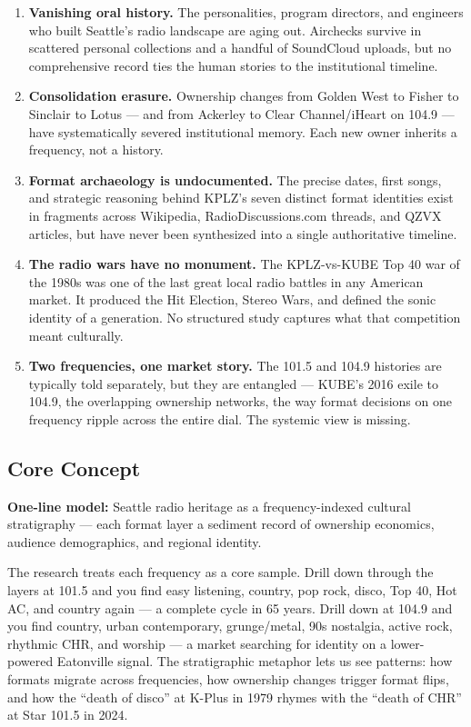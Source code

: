 \documentclass[11pt,letterpaper]{article}
\begin{document}
\begin{enumerate}[leftmargin=2em]
\item \textbf{Vanishing oral history.} The personalities, program directors, and engineers who built Seattle's radio landscape are aging out. Airchecks survive in scattered personal collections and a handful of SoundCloud uploads, but no comprehensive record ties the human stories to the institutional timeline.
\item \textbf{Consolidation erasure.} Ownership changes from Golden West to Fisher to Sinclair to Lotus --- and from Ackerley to Clear Channel/iHeart on 104.9 --- have systematically severed institutional memory. Each new owner inherits a frequency, not a history.
\item \textbf{Format archaeology is undocumented.} The precise dates, first songs, and strategic reasoning behind KPLZ's seven distinct format identities exist in fragments across Wikipedia, RadioDiscussions.com threads, and QZVX articles, but have never been synthesized into a single authoritative timeline.
\item \textbf{The radio wars have no monument.} The KPLZ-vs-KUBE Top 40 war of the 1980s was one of the last great local radio battles in any American market. It produced the Hit Election, Stereo Wars, and defined the sonic identity of a generation. No structured study captures what that competition meant culturally.
\item \textbf{Two frequencies, one market story.} The 101.5 and 104.9 histories are typically told separately, but they are entangled --- KUBE's 2016 exile to 104.9, the overlapping ownership networks, the way format decisions on one frequency ripple across the entire dial. The systemic view is missing.
\end{enumerate}

\subsection{Core Concept}

\textbf{One-line model:} Seattle radio heritage as a frequency-indexed cultural stratigraphy --- each format layer a sediment record of ownership economics, audience demographics, and regional identity.

The research treats each frequency as a core sample. Drill down through the layers at 101.5 and you find easy listening, country, pop rock, disco, Top 40, Hot AC, and country again --- a complete cycle in 65 years. Drill down at 104.9 and you find country, urban contemporary, grunge/metal, 90s nostalgia, active rock, rhythmic CHR, and worship --- a market searching for identity on a lower-powered Eatonville signal. The stratigraphic metaphor lets us see patterns: how formats migrate across frequencies, how ownership changes trigger format flips, and how the ``death of disco'' at K-Plus in 1979 rhymes with the ``death of CHR'' at Star 101.5 in 2024.
\end{document}
